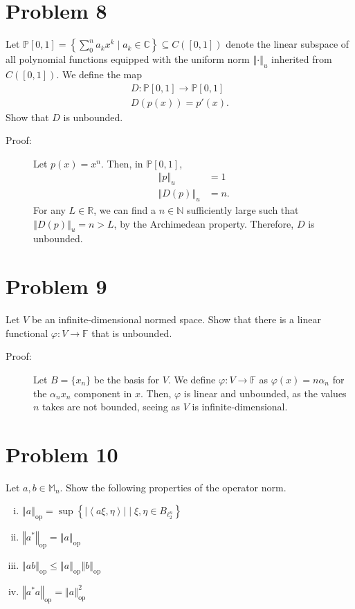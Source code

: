 \documentclass[8pt]{extarticle}
\newcommand{\N}{\mathbb{N}}
\newcommand{\R}{\mathbb{R}}
\newcommand{\C}{\mathbb{C}}
\newcommand{\iprod}[2]{\left\langle #1,#2\right\rangle}
\newcommand{\norm}[1]{\left\Vert #1\right\Vert}
\begin{document}
  \section{Problem 8}%
  Let $\mathbb{P}[0,1] = \left\{\sum_{0}^{n}a_kx^k\mid a_k\in\C\right\}\subseteq C([0,1])$ denote the linear subspace of all polynomial functions equipped with the uniform norm $\norm{\cdot}_{u}$ inherited from $C([0,1])$. We define the map
  \begin{align*}
    D:\mathbb{P}[0,1]\rightarrow \mathbb{P}[0,1]\\
    D(p(x)) = p'(x).
  \end{align*}
  Show that $D$ is unbounded.
  \begin{description}
    \item[Proof:] Let $p(x) = x^n$. Then, in $\mathbb{P}[0,1]$,
      \begin{align*}
        \norm{p}_u &= 1\\
        \norm{D(p)}_u &= n.
      \end{align*}
      For any $L\in \R$, we can find a $n\in \N$ sufficiently large such that $\norm{D(p)}_u = n > L$, by the Archimedean property. Therefore, $D$ is unbounded.
  \end{description}
  \section{Problem 9}%
  Let $V$ be an infinite-dimensional normed space. Show that there is a linear functional $\varphi: V\rightarrow \mathbb{F}$ that is unbounded.
  \begin{description}
    \item[Proof:] Let $B = \{x_n\}$ be the basis for $V$. We define $\varphi: V\rightarrow \mathbb{F}$ as $\varphi(x) = n\alpha_n$ for the $\alpha_nx_n$ component in $x$. Then, $\varphi$ is linear and unbounded, as the values $n$ takes are not bounded, seeing as $V$ is infinite-dimensional.
  \end{description}
  \section{Problem 10}%
  Let $a,b\in \mathbb{M}_{n}$. Show the following properties of the operator norm.
  \begin{enumerate}[(i)]
    \item $\norm{a}_{\text{op}} = \sup\left\{|\iprod{a\xi}{\eta}|\mid \xi,\eta\in B_{\ell_{2}^{n}} \right\}$
    \item $\norm{a^{\ast}}_{\text{op}} = \norm{a}_{\text{op}}$
    \item $\norm{ab}_{\text{op}} \leq \norm{a}_{\text{op}}\norm{b}_{\text{op}}$
    \item $\norm{a^{\ast}a}_{\text{op}} = \norm{a}^{2}_{\text{op}}$
  \end{enumerate}
\end{document}
